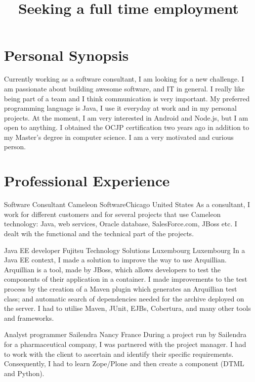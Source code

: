 \documentclass[12pt,a4paper]{moderncv}
\title{Seeking a full time employment}
\begin{document}
\maketitle

\section{Personal Synopsis}
Currently working as a software consultant, I am looking for a new challenge. I am passionate about building awesome software, and IT in general. I really like being part of a team and I think communication is very important. My preferred programming language is Java, I use it everyday at work and in my personal projects. At the moment, I am very interested in Android and Node.js, but I am open to anything. I obtained the OCJP certification two years ago in addition to my Master's degree in computer science. I am a very motivated and curious person.

\section{Professional Experience}
		{Software Consultant}
		{Cameleon Software}{Chicago}
		{United States}
		{As a consultant, I work for different customers and for several projects that use Cameleon technology: Java, web services, Oracle database, SalesForce.com, JBoss etc. I dealt wih the functional and the technical part of the projects.}{}

		{Java EE developer}
		{Fujitsu Technology Solutions}
		{Luxembourg}
		{Luxembourg}
		{In a Java EE context, I made a solution to improve the way to use Arquillian. Arquillian is a tool, made by JBoss, which allows developers to test the components of their application in a container. I made improvements to the test process by the creation of a Maven plugin which generates an Arquillian test class; and automatic search of dependencies needed for the archive deployed on the server. I had to utilise Maven, JUnit, EJBs, Cobertura, and many other tools and frameworks.}{}
				
		{Analyst programmer}
		{Sailendra}
		{Nancy}
		{France}
		{During a project run by Sailendra for a pharmaceutical company, I was partnered with the project
manager. I had to work with the client to ascertain and identify their specific requirements.
Consequently, I had to learn Zope/Plone and then create a component (DTML and Python).}{}
\end{document}
